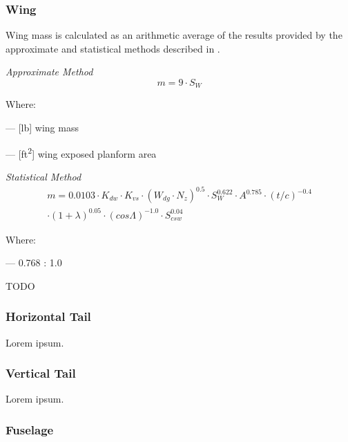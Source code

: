 \subsubsection{Wing}

Wing mass is calculated as an arithmetic average of the results provided by the approximate and statistical methods described in \cite{Raymer2018}.

\noindent \textit{Approximate Method}
\begin{equation}
  m = 9 \cdot S_W
\end{equation}

\noindent Where:
\begin{description}[align=right,labelwidth=1cm]
  \item [$m$]   --- [lb] wing mass
  \item [$S_W$] --- [ft\textsuperscript{2}] wing exposed planform area
\end{description}

\noindent \textit{Statistical Method}
\begin{multline}
  m
  =
  0.0103 \cdot K_{dw}
  \cdot K_{vs} \cdot \left( W_{dg} \cdot N_z \right)^{0.5}
  \cdot S_W^{0.622} \cdot A^{0.785} \cdot \left(t/c \right)^{-0.4} 
  \\
  \cdot \left( 1 + \lambda \right)^{0.05}
  \cdot \left( cos \Lambda \right)^{-1.0}
  \cdot S_{csw}^{0.04}
\end{multline}

\noindent Where:
\begin{description}[align=right,labelwidth=1cm]
  \item [$K_{dw}$] --- 0.768 : 1.0
  \item TODO
\end{description}

\subsubsection{Horizontal Tail}

Lorem ipsum.

\subsubsection{Vertical Tail}

Lorem ipsum.

\subsubsection{Fuselage}

